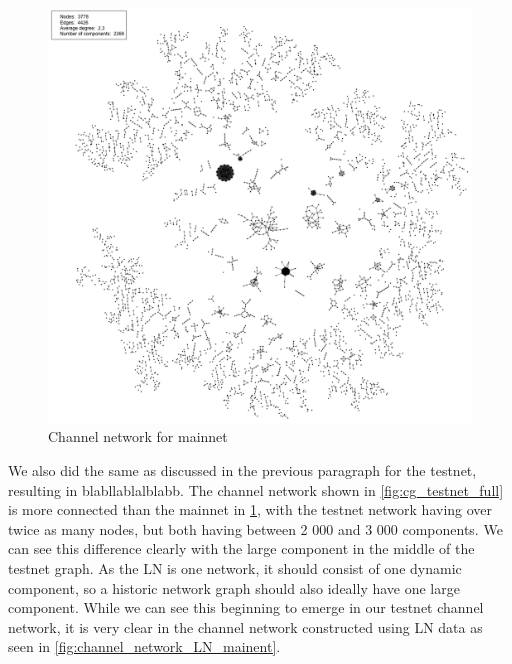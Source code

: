 \begin{figure}[ht]
    \centering
    \includegraphics[width=14cm]{figures/graphs/cg_bc_mainnet_full.png}
    \caption{Channel network for mainnet}
    \label{fig:cg_mainnet_full}
\end{figure}

We also did the same as discussed in the previous paragraph for the testnet, resulting in blabllablalblabb.
The channel network shown in \cref{fig:cg_testnet_full} is more connected than the mainnet in \cref{fig:cg_mainnet_full}, with the testnet network having over twice as many nodes, but both having between 2 000 and 3 000 components. We can see this difference clearly with the large component in the middle of the testnet graph. As the LN is one network, it should consist of one dynamic component, so a historic network graph should also ideally have one large component. While we can see this beginning to emerge in our testnet channel network, it is very clear in the channel network constructed using LN data as seen in \cref{fig:channel_network_LN_mainent}.
\\


